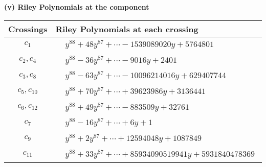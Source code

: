 \documentclass[1p]{elsarticle_modified}
\theoremstyle{definition}
\begin{document}
\newpage\renewcommand{\arraystretch}{1}
\flushleft \textbf{(v) Riley Polynomials at the component}\newline \\
\begin{tabular}{m{50pt}|m{274pt}}
Crossings & \hspace{64pt}Riley Polynomials at each crossing \\
\hline $$\begin{aligned}c_{1}\end{aligned}$$&$\begin{aligned}
&y^{88}+48 y^{87}+\cdots-1539089020 y+5764801
\end{aligned}$\\
\hline $$\begin{aligned}c_{2},c_{4}\end{aligned}$$&$\begin{aligned}
&y^{88}-36 y^{87}+\cdots-9016 y+2401
\end{aligned}$\\
\hline $$\begin{aligned}c_{3},c_{8}\end{aligned}$$&$\begin{aligned}
&y^{88}-63 y^{87}+\cdots-10096214016 y+629407744
\end{aligned}$\\
\hline $$\begin{aligned}c_{5},c_{10}\end{aligned}$$&$\begin{aligned}
&y^{88}+70 y^{87}+\cdots+39623986 y+3136441
\end{aligned}$\\
\hline $$\begin{aligned}c_{6},c_{12}\end{aligned}$$&$\begin{aligned}
&y^{88}+49 y^{87}+\cdots-883509 y+32761
\end{aligned}$\\
\hline $$\begin{aligned}c_{7}\end{aligned}$$&$\begin{aligned}
&y^{88}-16 y^{87}+\cdots+6 y+1
\end{aligned}$\\
\hline $$\begin{aligned}c_{9}\end{aligned}$$&$\begin{aligned}
&y^{88}+2 y^{87}+\cdots+12594048 y+1087849
\end{aligned}$\\
\hline $$\begin{aligned}c_{11}\end{aligned}$$&$\begin{aligned}
&y^{88}+33 y^{87}+\cdots+85934090519941 y+5931840478369
\end{aligned}$\\
\hline
\end{tabular}\\~\\
\end{document}
